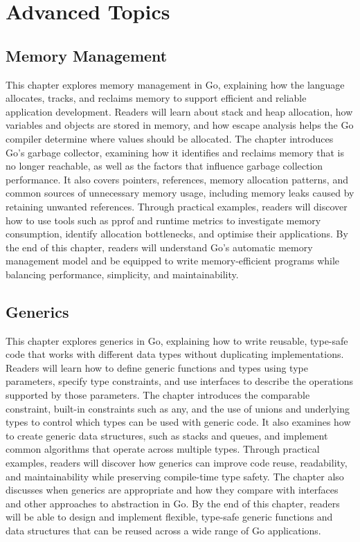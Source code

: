 \documentclass[12pt,oneside]{book}
\begin{document}
\part{Advanced Topics}

\chapter{Memory Management}
\begin{chaptersummary}
This chapter explores memory management in Go, explaining how the language allocates, tracks, and reclaims memory to support efficient and reliable application development. Readers will learn about stack and heap allocation, how variables and objects are stored in memory, and how escape analysis helps the Go compiler determine where values should be allocated. The chapter introduces Go’s garbage collector, examining how it identifies and reclaims memory that is no longer reachable, as well as the factors that influence garbage collection performance. It also covers pointers, references, memory allocation patterns, and common sources of unnecessary memory usage, including memory leaks caused by retaining unwanted references. Through practical examples, readers will discover how to use tools such as pprof and runtime metrics to investigate memory consumption, identify allocation bottlenecks, and optimise their applications. By the end of this chapter, readers will understand Go’s automatic memory management model and be equipped to write memory-efficient programs while balancing performance, simplicity, and maintainability.
\end{chaptersummary}


\chapter{Generics}
\begin{chaptersummary}
This chapter explores generics in Go, explaining how to write reusable, type-safe code that works with different data types without duplicating implementations. Readers will learn how to define generic functions and types using type parameters, specify type constraints, and use interfaces to describe the operations supported by those parameters. The chapter introduces the comparable constraint, built-in constraints such as any, and the use of unions and underlying types to control which types can be used with generic code. It also examines how to create generic data structures, such as stacks and queues, and implement common algorithms that operate across multiple types. Through practical examples, readers will discover how generics can improve code reuse, readability, and maintainability while preserving compile-time type safety. The chapter also discusses when generics are appropriate and how they compare with interfaces and other approaches to abstraction in Go. By the end of this chapter, readers will be able to design and implement flexible, type-safe generic functions and data structures that can be reused across a wide range of Go applications.
\end{chaptersummary}

\end{document}
